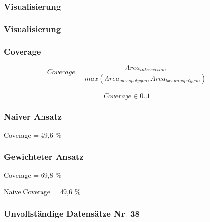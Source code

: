 \begin{frame}
  \frametitle{Visualisierung}
\end{frame}

\begin{frame}
  \frametitle{Visualisierung}
\end{frame}


\begin{frame}
  \frametitle{Coverage}
  \begin{equation*}
    Coverage = \frac{Area_{intersection}}{max(Area_{guesspolygon},Area_{loesungspolygon})}
  \end{equation*}
\\
  \begin{equation*}
    Coverage \in {0..1}
  \end{equation*}
\end{frame}

\begin{frame}
  \frametitle{Naiver Ansatz}
  \begin{center}
  \huge{Coverage = 49,6 \%}
  \end{center}
\end{frame}

\begin{frame}
  \frametitle{Gewichteter Ansatz}
  \begin{center}
  \huge{Coverage = 69,8 \%}
  \end{center}
  \begin{center}
  Naive Coverage = 49,6 \%
  \end{center}
\end{frame}


\begin{frame}
  \frametitle{Unvollständige Datensätze \hfill Nr. 38}
\end{frame}


